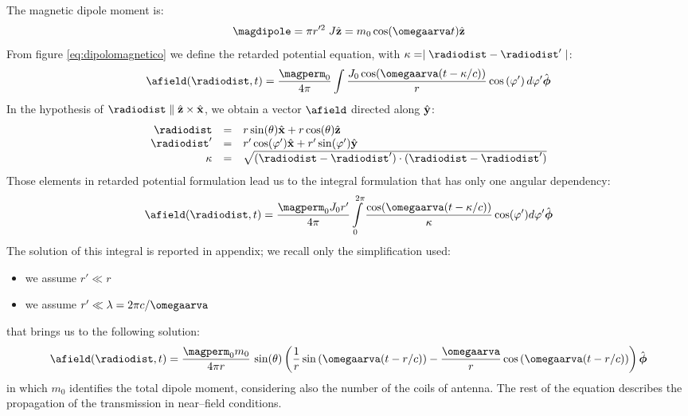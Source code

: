 The magnetic dipole moment is:
\begin{equation}
\magdipole = \pi r'^2\; J \vrz = m_0 \cos(\omegaarva t) \vrz
\label{eq:dipolodacorrente}
\end{equation}
From figure \ref{eq:dipolomagnetico} we define the retarded potential equation, with ${\kappa = \mid \radiodist-\radiodist'\mid}$:
\[
\afield(\radiodist,t) = \dfrac{\magperm_0}{4\pi}\int{\dfrac{J_0\cos(\omegaarva (t - \kappa/c))}{r}\ccos{\varphi'}d\varphi'}\hat{\boldsymbol{\phi}}
\]
In the hypothesis of ${\radiodist\parallel\vrz\times\vrx}$, we obtain a vector $\afield$ directed along $\hat{\mathbf{y}}$:
\[\begin{array}{rcl}
\radiodist & = & r \sin(\theta) \vrx + r \cos(\theta) \vrz \\
\radiodist' & = & r' \cos(\varphi') \vrx + r' \sin(\varphi') \vry \\
\kappa & = & \sqrt{(\radiodist - \radiodist')\cdot(\radiodist - \radiodist')}
\end{array}\]
Those elements in retarded potential formulation lead us to the integral formulation that has only one angular dependency:
\begin{equation}
\label{eq:integraledacalc}
\afield(\radiodist,t) = \dfrac{\magperm_0 J_0 r'}{4\pi}\int\limits_{0}^{2\pi}{\dfrac{\cos(\omegaarva (t - \kappa/c))}{\kappa} \cos(\varphi') d\varphi' \hat{\boldsymbol{\phi}}}
\end{equation}
The solution of this integral is reported in appendix; we recall only the simplification used:
\begin{itemize}
\item we assume $r' \ll r$
\item we assume $r' \ll \lambda = 2\pi c/\omegaarva$
\end{itemize}
that brings us to the following solution:
\begin{equation}
\label{eq:soluzioneint}
\afield(\radiodist,t) = \dfrac{\magperm_0 m_0}{4\pi r}\,\sin(\theta)\left( \dfrac{1}{r} \sin\left(\omegaarva(t-r/c)\right) - \dfrac{\omegaarva}{r}\cos\left(\omegaarva(t-r/c)\right)\right)\hat{\boldsymbol{\phi}}
\end{equation}
in which $m_0$ identifies the total dipole moment, considering also the number of the coils of antenna. The rest of the equation describes the propagation of the transmission in near--field conditions.

